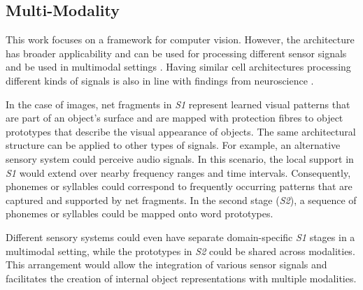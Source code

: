 \subsection{Multi-Modality}
This work focuses on a framework for computer vision. However, the architecture has broader applicability and can be used for processing different sensor signals and be used in multimodal settings \cite{ngiam_multimodal_2011, liu_learn_2018, baltrusaitis_multimodal_2019}.
Having similar cell architectures processing different kinds of signals is also in line with findings from neuroscience .

In the case of images, net fragments in \emph{S1} represent learned visual patterns that are part of an object's surface and are mapped with protection fibres to object prototypes that describe the visual appearance of objects. 
The same architectural structure can be applied to other types of signals. For example, an alternative sensory system could perceive audio signals. In this scenario, the local support in \emph{S1} would extend over nearby frequency ranges and time intervals. Consequently, phonemes or syllables could correspond to frequently occurring patterns that are captured and supported by net fragments. In the second stage (\emph{S2}), a sequence of phonemes or syllables could be mapped onto word prototypes.

Different sensory systems could even have separate domain-specific \emph{S1} stages in a multimodal setting, while the prototypes in \emph{S2} could be shared across modalities. This arrangement would allow the integration of various sensor signals and facilitates the creation of internal object representations with multiple modalities.